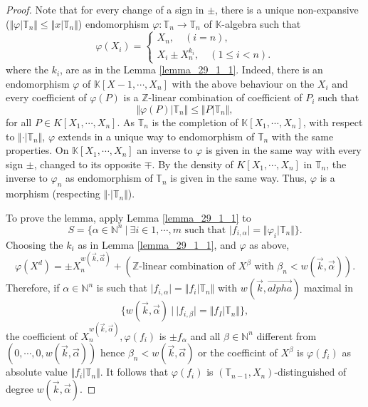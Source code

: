 \documentclass[10pt]{article}
\numberwithin{equation}{section}
\theoremstyle{definition}
\newcommand{\norm}[1]{\Vert #1 \Vert}
\newcommand{\N}[0]{\mathbb{N}}
\newcommand{\Z}[0]{\mathbb{Z}}
\newcommand{\T}[0]{\mathbb{T}}
\newcommand{\K}[0]{\mathbb{K}}
\newcommand{\sep}[0]{\:|\:}
\newcommand{\ab}[1]{\vert #1 \vert}
\begin{document}
\begin{proof}
  Note that for every change of a sign in $\pm$, there is a unique non-expansive ($\norm{\varphi|\T_n}\leq \norm{x|\T_n}$) endomorphism $\varphi:\T_n\to \T_n$ of $\K$-algebra such that 
  \begin{equation*}
    \varphi(X_i)=\begin{cases}
      X_n,\quad(i=n),\\
      X_i\pm X_n^{k_i},\quad (1\leq i<n).
    \end{cases}
  \end{equation*}
  where the $k_i$, are as in the Lemma \ref{lemma_29_1_1}. Indeed, there is an endomorphism $\varphi$ of $\K[X-1,\cdots,X_n]$ with the above behaviour on the $X_i$ and every coefficient of $\varphi(P)$ is a $\Z$-linear combination of coefficient of $P_i$ such that 
  \begin{equation*}
  \norm{\varphi(P)|\T_n}\leq\norm{P|\T_n},
  \end{equation*}
  for all $P\in K[X_1,\cdots,X_n]$. As $\T_n$ is the completion of $\K[X_1,\cdots,X_n]$, with respect to $\norm{\cdot\vert\T_n}$, $\varphi$ extends in a unique way to endomorphism of $\T_n$ with the same properties. 
  On $\K[X_1,\cdots,X_n]$ an inverse to $\varphi$ is given in the same way with every sign $\pm$, changed to its opposite $\mp$. By the density of $K[X_1,\cdots,X_n]$ in $\T_n$, the inverse to $\varphi_n$ as endomorphism of $\T_n$ is given in the same way. Thus, $\varphi$ is a morphism (respecting $\norm{\cdot\vert\T_n}$).
  \par To prove the lemma, apply Lemma \ref{lemma_29_1_1} to 
  \begin{equation*}
    S = \{\alpha\in\N^n\sep \exists i\in 1,\cdots,m\text{ such that } \ab{f_{i,\alpha}}=\norm{\varphi_i\vert \T_n}\}.
  \end{equation*}
  Choosing the $k_i$ as in Lemma \ref{lemma_29_1_1}, and $\varphi$ as above, 
  \begin{equation}
    \varphi(X^d) = \pm X_n^{w(\vec{k},\vec{\alpha})}+(\text{$\mathbb{Z}$-linear combination of $X^\beta$ with $\beta_n<w(\vec{k},\vec{\alpha})$}).
  \end{equation}
  Therefore, if $\alpha\in\N^n$ is such that $\ab{f_{i,\alpha}}=\norm{f_i\vert \T_n}$ with $w(\vec{k},\vec{alpha})$ maximal in 
  \begin{equation*}
  \{w(\vec{k},\vec{\alpha})\sep \ab{f_{i,\beta}}=\norm{f_I\vert\T_n}\},
  \end{equation*}
  the coefficient of $X_n^{w(\vec{k},\vec{\alpha})},\varphi(f_i)$ is $\pm f_\alpha$ and all $\beta\in\N^n$ different from $(0,\cdots,0,w(\vec{k},\vec{\alpha}))$ hence $\beta_n<w(\vec{k},\vec{\alpha})$ or the coefficint of $X^\beta$ is $\varphi(f_i)$ as absolute value $\norm{f_i\vert\T_n}$. 
  It follows that $\varphi(f_i)$ is $(\T_{n-1},X_n)$-distinguished of degree $w(\vec{k},\vec{\alpha})$.
\end{proof}
\end{document}
